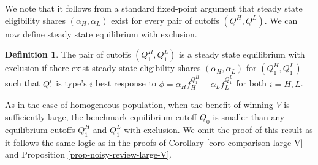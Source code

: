 \documentclass[12pt]{article}
\theoremstyle{plain}
\theoremstyle{definition}
\newtheorem{corollary}{Corollary}
\newtheorem{definition}{Definition}
\newtheorem{lemma}{Lemma}
\theoremstyle{remark}
\begin{document}


We note that it follows from a standard fixed-point argument that steady state eligibility shares $(\alpha_H,\alpha_L)$ exist for every pair of cutoffs $(Q^H,Q^L)$. We can now define steady state equilibrium with exclusion.

\begin{definition}\label{def-equilibrium-types}
    The pair of cutoffs $(Q_1^H,Q_1^L)$ is a steady state equilibrium with exclusion if there exist steady state eligibility shares $(\alpha_H,\alpha_L)$ for $(Q_1^H,Q_1^L)$ such that $Q_1^i$ is type's $i$ best response to $\phi=\alpha_H f_H^{Q_1^H} + \alpha_L f_L^{Q_1^L}$ for both $i=H,L$. 
\end{definition}



As in the case of homogeneous population, when the benefit of winning $V$ is sufficiently large, the benchmark equilibrium cutoff $Q_0$ is smaller than any equilibrium cutoffs $Q_1^H$ and $Q_1^L$ with exclusion. We omit the proof of this result as it follows the same logic as in the proofs of Corollary \ref{coro-comparison-large-V} and Proposition \ref{prop-noisy-review-large-V}. 
\end{document}
